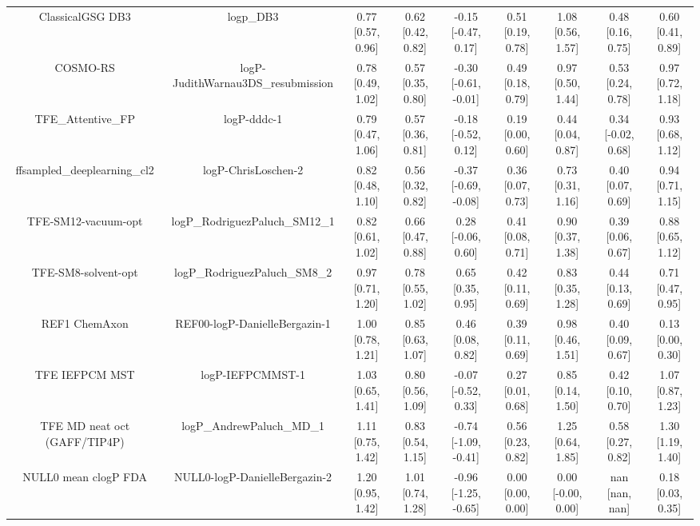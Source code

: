 \documentclass{article}
\begin{document}
\begin{center}
\begin{longtable}{|ccccccccc|}
             ClassicalGSG DB3 &                                      logp\_DB3 &  0.77 [0.57, 0.96] &  0.62 [0.42, 0.82] &   -0.15 [-0.47, 0.17] &  0.51 [0.19, 0.78] &     1.08 [0.56, 1.57] &     0.48 [0.16, 0.75] &     0.60 [0.41, 0.89] \\
                     COSMO-RS &             logP-JudithWarnau3DS\_resubmission &  0.78 [0.49, 1.02] &  0.57 [0.35, 0.80] &  -0.30 [-0.61, -0.01] &  0.49 [0.18, 0.79] &     0.97 [0.50, 1.44] &     0.53 [0.24, 0.78] &     0.97 [0.72, 1.18] \\
             TFE_Attentive_FP &                                    logP-dddc-1 &  0.79 [0.47, 1.06] &  0.57 [0.36, 0.81] &   -0.18 [-0.52, 0.12] &  0.19 [0.00, 0.60] &     0.44 [0.04, 0.87] &    0.34 [-0.02, 0.68] &     0.93 [0.68, 1.12] \\
   ffsampled_deeplearning_cl2 &                            logP-ChrisLoschen-2 &  0.82 [0.48, 1.10] &  0.56 [0.32, 0.82] &  -0.37 [-0.69, -0.08] &  0.36 [0.07, 0.73] &     0.73 [0.31, 1.16] &     0.40 [0.07, 0.69] &     0.94 [0.71, 1.15] \\
          TFE-SM12-vacuum-opt &                 logP\_RodriguezPaluch\_SM12\_1 &  0.82 [0.61, 1.02] &  0.66 [0.47, 0.88] &    0.28 [-0.06, 0.60] &  0.41 [0.08, 0.71] &     0.90 [0.37, 1.38] &     0.39 [0.06, 0.67] &     0.88 [0.65, 1.12] \\
          TFE-SM8-solvent-opt &                  logP\_RodriguezPaluch\_SM8\_2 &  0.97 [0.71, 1.20] &  0.78 [0.55, 1.02] &     0.65 [0.35, 0.95] &  0.42 [0.11, 0.69] &     0.83 [0.35, 1.28] &     0.44 [0.13, 0.69] &     0.71 [0.47, 0.95] \\
                REF1 ChemAxon &                  REF00-logP-DanielleBergazin-1 &  1.00 [0.78, 1.21] &  0.85 [0.63, 1.07] &     0.46 [0.08, 0.82] &  0.39 [0.11, 0.69] &     0.98 [0.46, 1.51] &     0.40 [0.09, 0.67] &     0.13 [0.00, 0.30] \\
               TFE IEFPCM MST &                               logP-IEFPCMMST-1 &  1.03 [0.65, 1.41] &  0.80 [0.56, 1.09] &   -0.07 [-0.52, 0.33] &  0.27 [0.01, 0.68] &     0.85 [0.14, 1.50] &     0.42 [0.10, 0.70] &     1.07 [0.87, 1.23] \\
 TFE MD neat oct (GAFF/TIP4P) &                      logP\_AndrewPaluch\_MD\_1 &  1.11 [0.75, 1.42] &  0.83 [0.54, 1.15] &  -0.74 [-1.09, -0.41] &  0.56 [0.23, 0.82] &     1.25 [0.64, 1.85] &     0.58 [0.27, 0.82] &     1.30 [1.19, 1.40] \\
         NULL0 mean clogP FDA &                  NULL0-logP-DanielleBergazin-2 &  1.20 [0.95, 1.42] &  1.01 [0.74, 1.28] &  -0.96 [-1.25, -0.65] &  0.00 [0.00, 0.00] &    0.00 [-0.00, 0.00] &        nan [nan, nan] &     0.18 [0.03, 0.35] \\

\end{longtable}
\end{center}
\end{document}
